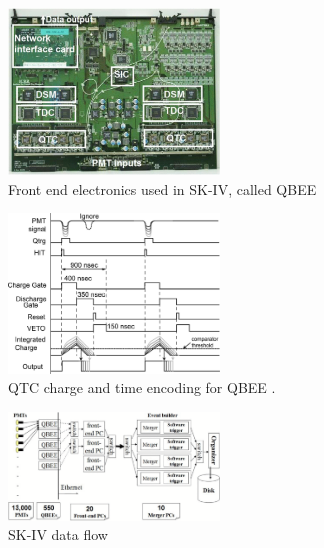 \begin{figure}
\centering
\includegraphics[width=0.5\textwidth]{figures/QBEE.png}
\caption{Front end electronics used in SK-IV, called QBEE \cite{Yamada:2010zzc}}
\label{fig:QBEE}
\end{figure}      

\begin{figure}
\centering
\includegraphics[width=0.5\textwidth]{figures/QTC_timing.jpg}
\caption{QTC charge and time encoding for QBEE \cite{Nishino:2009zu}.}
\label{fig:QTC_timing}
\end{figure}    

\begin{figure}
\centering
\includegraphics[width=0.5\textwidth]{figures/SK_4_data_flow.png}
\caption{SK-IV data flow \cite{Yamada:2010zzc}}
\label{fig:sk_4_data_flow}
\end{figure} 